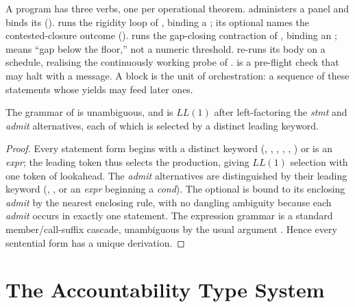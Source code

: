 \begin{remark}
\label{cfc:rem:core-forms}
A  program has three verbs, one per operational theorem.
 administers a panel and binds its 
().  runs the rigidity loop
of , binding a ; its optional
 names the contested-closure outcome
(). 
runs the gap-closing contraction of , binding an
;  means ``gap below the floor,'' not a numeric
threshold.  re-runs its body on a schedule,
realising the continuously working probe of .
 is a pre-flight check that may halt with a message.
A  block is the unit of orchestration: a sequence of these
statements whose yields may feed later ones.
\end{remark}

\begin{theorem}
\label{cfc:thm:unambiguous}
The grammar of  is unambiguous, and is $LL(1)$ after
left-factoring the \textit{stmt} and \textit{admit} alternatives, each of which
is selected by a distinct leading keyword.
\end{theorem}

\begin{proof}
Every statement form begins with a distinct keyword (,
, , , , ) or is an
\textit{expr}; the leading token thus selects the production, giving $LL(1)$
selection with one token of lookahead. The \textit{admit} alternatives are
distinguished by their leading keyword (, , or an
\textit{expr} beginning a \textit{cond}). The optional
 is bound to its enclosing \textit{admit} by the nearest
enclosing rule, with no dangling ambiguity because each \textit{admit} occurs
in exactly one statement. The expression grammar is a standard
member/call-suffix cascade, unambiguous by the usual argument
\citep{aho2006compilers}. Hence every sentential form has a unique derivation.
\end{proof}

\section{The Accountability Type System}
\label{cfc:sec:types}

